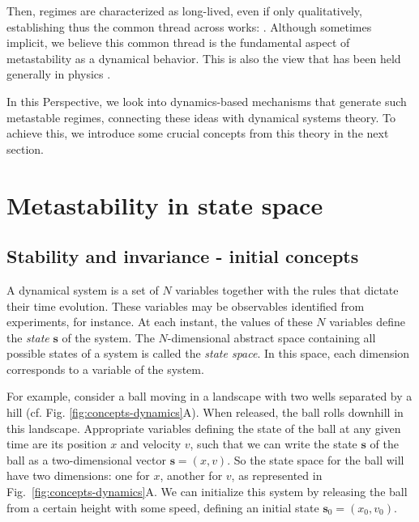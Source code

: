 Then, regimes are characterized as long-lived, even if only qualitatively, establishing thus the common thread across works: . Although sometimes implicit, we believe this common thread is the fundamental aspect of metastability as a dynamical behavior. This is also the view that has been held generally in physics \cite{olivieri2005large, callen1991thermodynamics}.

In this Perspective, we look into dynamics-based mechanisms that generate such metastable regimes, connecting these ideas with dynamical systems theory. To achieve this, we introduce some crucial concepts from this theory in the next section. 


\section{Metastability in state space}\label{sec:nonlinear}

\subsection{Stability and invariance - initial concepts}\label{sec:stability_and_invariance}

A dynamical system is a set of $N$ variables together with the rules that dictate their time evolution. These variables may be observables identified from experiments, for instance. At each instant, the values of these $N$ variables define the \textit{state} $\mathbf{s}$ of the system. The $N$-dimensional abstract space containing all possible states of a system is called the \textit{state space}. In this space, each dimension corresponds to a variable of the system. 

For example, consider a ball moving in a landscape with two wells separated by a hill (cf. Fig. \ref{fig:concepts-dynamics}A). When released, the ball rolls downhill in this landscape. Appropriate variables defining the state of the ball at any given time are its position $x$ and velocity $v$, such that we can write the state $\textbf{s}$ of the ball as a two-dimensional vector $\mathbf{s} = (x,v)$. So the state space for the ball will have two dimensions: one for $x$, another for $v$, as represented in Fig.~\ref{fig:concepts-dynamics}A\supprime. We can initialize this system by releasing the ball from a certain height with some speed, defining an initial state $\mathbf{s}_0 = (x_0, v_0)$. 

